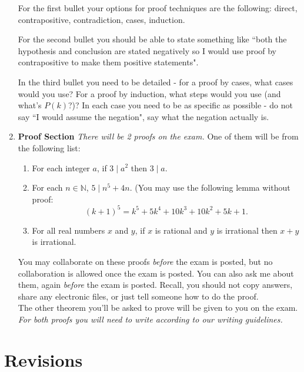 \documentclass[12pt]{amsart}
\theoremstyle{definition}
\newcommand{\N}{\mathbb{N}}
\begin{document}
\begin{enumerate}
\begin{itemize}
	\end{itemize}
	
	For the first bullet your options for proof techniques are the following:  direct, contrapositive, contradiction, cases, induction.
	
	For the second bullet you should be able to state something like ``both the hypothesis and conclusion are stated negatively so I would use proof by contrapositive to make them positive statements".

	In the third bullet you need to be detailed - for a proof by cases, what cases would you use? For a proof by induction, what steps would you use (and what's $P(k)$?)? In each case you need to be as specific as possible - do not say ``I would assume the negation", say what the negation actually is. 
	
	\vfill
	
\item {\bf Proof Section} \emph{ There will be 2 proofs on the exam.} One of them will be from the following list:
\begin{enumerate}
\item For each integer $a$, if $3\mid a^2$ then $3\mid a$.
\item For each $n\in\N$, $5\mid n^5 + 4n$. (You may use the following lemma without proof:
	\[ (k+1)^5 = k^5+5k^4+10k^3+10k^2+5k+1.\]
\item For all real numbers $x$ and $y$, if $x$ is rational and $y$ is irrational then $x+y$ is irrational.
\end{enumerate}
You may collaborate on these proofs \emph{before} the exam is posted, but no collaboration is allowed once the exam is posted. You can also ask me about them, again \emph{before} the exam is posted. Recall, you should not copy answers, share any electronic files, or just tell someone how to do the proof.\\
 
\noindent The other theorem you'll be asked to prove will be given to you on the exam.\\
  
\noindent \emph{ For both proofs you will need to write according to our writing guidelines.}
\vfill
\end{enumerate}

\newpage

\section{Revisions}
\end{document}
